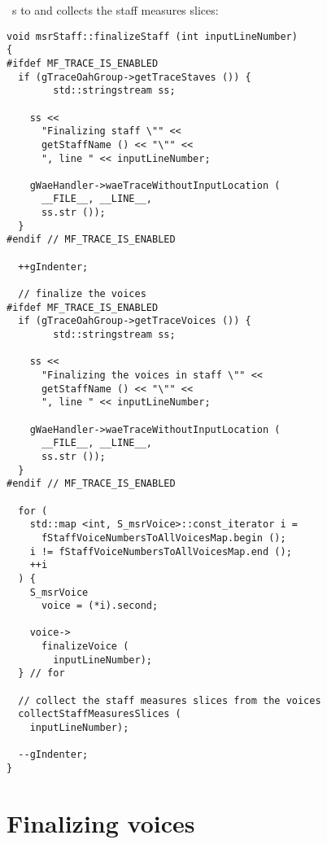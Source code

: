  \cascade\ s to  and collects the staff measures slices:
\begin{lstlisting}[language=CPlusPlus]
void msrStaff::finalizeStaff (int inputLineNumber)
{
#ifdef MF_TRACE_IS_ENABLED
  if (gTraceOahGroup->getTraceStaves ()) {
		std::stringstream ss;

    ss <<
      "Finalizing staff \"" <<
      getStaffName () << "\"" <<
      ", line " << inputLineNumber;

    gWaeHandler->waeTraceWithoutInputLocation (
      __FILE__, __LINE__,
      ss.str ());
  }
#endif // MF_TRACE_IS_ENABLED

  ++gIndenter;

  // finalize the voices
#ifdef MF_TRACE_IS_ENABLED
  if (gTraceOahGroup->getTraceVoices ()) {
		std::stringstream ss;

    ss <<
      "Finalizing the voices in staff \"" <<
      getStaffName () << "\"" <<
      ", line " << inputLineNumber;

    gWaeHandler->waeTraceWithoutInputLocation (
      __FILE__, __LINE__,
      ss.str ());
  }
#endif // MF_TRACE_IS_ENABLED

  for (
    std::map <int, S_msrVoice>::const_iterator i =
      fStaffVoiceNumbersToAllVoicesMap.begin ();
    i != fStaffVoiceNumbersToAllVoicesMap.end ();
    ++i
  ) {
    S_msrVoice
      voice = (*i).second;

    voice->
      finalizeVoice (
        inputLineNumber);
  } // for

  // collect the staff measures slices from the voices
  collectStaffMeasuresSlices (
    inputLineNumber);

  --gIndenter;
}
\end{lstlisting}


\section{Finalizing voices}

